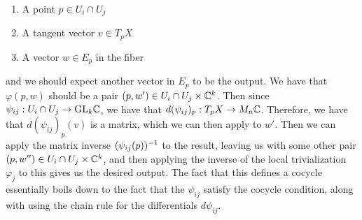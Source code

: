 \begin{enumerate}
  \item A point $p \in U_i \cap U_j$
  \item A tangent vector $v \in T_pX$
  \item A vector $w \in E_p$ in the fiber
\end{enumerate}
%
and we should expect another vector in $E_p$ to be the output. We have that
$\varphi(p,w)$ should be a pair $(p, w') \in U_i \cap U_j \times \mathbb{C}^k$. Then
since $\psi_{ij} : U_i \cap U_j \to \mathrm{GL}_k\mathbb{C}$, we have that
$d(\psi_{ij})_p : T_pX \to M_n\mathbb{C}$. Therefore, we have that
$d(\psi_{ij})_p(v)$ is a matrix, which we can then apply to $w'$.
Then we can apply the matrix inverse $(\psi_{ij}(p))^{-1}$ to the result, leaving
us with some other pair $(p,w'') \in U_i \cap U_j \times \mathbb{C}^k$, and then applying the
inverse of the local trivialization $\varphi_j$ to this gives us the desired output.
The fact that this defines a cocycle essentially boils down to the fact that the
$\psi_{ij}$ satisfy the cocycle condition, along with using the chain rule for
the differentials $d\psi_{ij}$.
%
%

